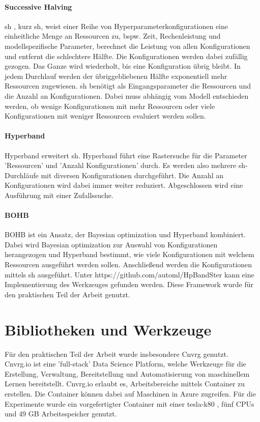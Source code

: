 	\paragraph{Successive Halving}
	\acl{sh} \cite{Jamieson.2015}, kurz \ac{sh}, weist einer Reihe von Hyperparameterkonfigurationen eine einheitliche Menge an Ressourcen zu, bspw. Zeit, Rechenleistung und modellspezifische Parameter, berechnet die Leistung von allen Konfigurationen und entfernt die schlechtere Hälfte. Die Konfigurationen werden dabei zufällig gezogen. Das Ganze wird wiederholt, bis eine Konfiguration übrig bleibt. In jedem Durchlauf werden der übriggebliebenen Hälfte exponentiell mehr Ressourcen zugewiesen. \ac{sh} benötigt als Eingangsparameter die Ressourcen und die Anzahl an Konfigurationen. Dabei muss abhängig vom Modell entschieden werden, ob wenige Konfigurationen mit mehr Ressourcen oder viele Konfigurationen mit weniger Ressourcen evaluiert werden sollen.
			
	\paragraph{Hyperband}	
	Hyperband \cite{Li.2017} erweitert \acl{sh}. Hyperband führt eine Rastersuche für die Parameter 'Ressourcen' und 'Anzahl Konfigurationen' durch. Es werden also mehrere \ac{sh}-Durchläufe mit diversen Konfigurationen durchgeführt. Die Anzahl an Konfigurationen wird dabei immer weiter reduziert. Abgeschlossen wird eine Ausführung mit einer Zufallssuche.
	
	\paragraph{BOHB}
	BOHB \cite{StefanFalkner.2018} ist ein Ansatz, der Bayesian optimization und Hyperband kombiniert. Dabei wird Bayesian optimization zur Auswahl von Konfigurationen herangezogen und Hyperband bestimmt, wie viele Konfigurationen mit welchem Ressourcen ausgeführt werden sollen. Anschließend werden die Konfigurationen mittels \acl{sh} ausgeführt. Unter https://github.com/automl/HpBandSter kann eine Implementierung des Werkzeuges gefunden werden. Diese Framework wurde für den praktischen Teil der Arbeit genutzt. 
			
	\section{Bibliotheken und Werkzeuge}
	\label{sec:BibliothekenundWerkzeuge}
	Für den praktischen Teil der Arbeit wurde insbesondere Cnvrg \cite{Kolben.2020} genutzt.\\
	Cnvrg.io ist eine 'full-stack' Data Science Platform, welche Werkzeuge für die Erstellung, Verwaltung, Bereitstellung und Automatisierung von maschinellem Lernen bereitstellt. Cnvrg.io erlaubt es, Arbeitsbereiche mittels Container zu erstellen. Die Container können dabei auf Maschinen in Azure \cite{MicrosoftCorporation.2020} zugreifen. Für die Experimente wurde ein vorgefertigter Container mit einer tesla-k80 \cite{Nvidia.2020}, fünf CPUs und 49 GB Arbeitsspeicher genutzt. 

